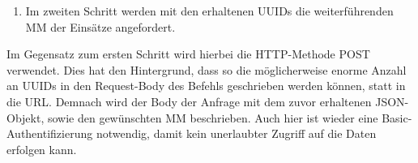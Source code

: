 \begin{enumerate}[resume]
\item Im zweiten Schritt werden mit den erhaltenen UUIDs die weiterführenden \gls{MM} der Einsätze angefordert.
\end{enumerate}

Im Gegensatz zum ersten Schritt wird hierbei die HTTP-Methode \glqq POST\grqq{} verwendet.
Dies hat den Hintergrund, dass so die möglicherweise enorme Anzahl an \gls{UUID}s in den Request-Body des Befehls geschrieben werden können, statt in die URL.
Demnach wird der Body der Anfrage mit dem zuvor erhaltenen JSON-Objekt, sowie den gewünschten \gls{MM} beschrieben.
Auch hier ist wieder eine Basic-Authentifizierung notwendig, damit kein unerlaubter Zugriff auf die Daten erfolgen kann.

